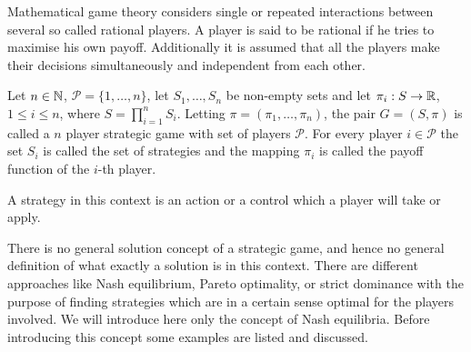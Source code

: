 Mathematical game theory considers single or repeated interactions between several so called rational players. A player is said to be rational if he 
tries to maximise his own payoff. Additionally it is assumed that all the players make their decisions simultaneously and independent from each other.

\begin{definition}\label{def:game}
    Let $n\in\mathbb{N}$, $\mathcal{P} = \{1, \ldots, n\}$, let $S_{1}, \ldots, S_{n}$ be non-empty sets and let $\pi_{i}:S\to\mathbb{R}$, $1\leq i\leq n$, where
    $S = \prod_{i = 1}^{n}S_{i}$. Letting $\pi = (\pi_{1}, \ldots, \pi_{n})$, the pair $G = (S, \pi)$ is called a $n$ player strategic game with set
    of players $\mathcal{P}$. For every player $i\in\mathcal{P}$ the set $S_{i}$ is called the set of strategies and the mapping 
    $\pi_i$ is called the payoff function of the $i$-th player.
\end{definition}

\begin{remark}
    A strategy in this context is an action or a control which a player will take or apply.
\end{remark}

There is no general solution concept of a strategic game, and hence no general definition of what exactly a solution is in this context. There are different 
approaches like Nash equilibrium, Pareto optimality, or strict dominance with the purpose of finding strategies
which are in a certain sense optimal for the players involved. We will introduce here only the concept of Nash equilibria. Before introducing this concept some
examples are listed and discussed.

